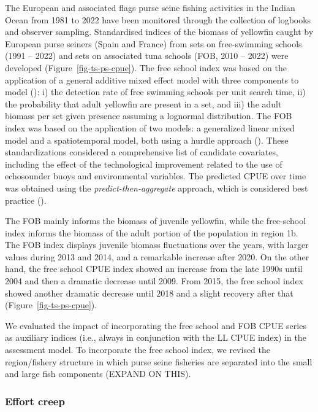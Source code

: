 \documentclass[
]{scrartcl}
\begin{document}
The European and associated flags purse seine fishing activities in the
Indian Ocean from 1981 to 2022 have been monitored through the
collection of logbooks and observer sampling. Standardised indices of
the biomass of yellowfin caught by European purse seiners (Spain and
France) from sets on free-swimming schools (1991 -- 2022) and sets on
associated tuna schools (FOB, 2010 -- 2022) were developed
(Figure~\ref{fig-ts-ps-cpue}). The free school index was based on the
application of a general additive mixed effect model with three
components to model
(): i) the detection rate of free swimming schools per unit search
time, ii) the probability that adult yellowfin are present in a set, and
iii) the adult biomass per set given presence assuming a lognormal
distribution. The FOB index was based on the application of two models:
a generalized linear mixed model and a spatiotemporal model, both using
a hurdle approach (). These standardizations considered a comprehensive list of
candidate covariates, including the effect of the technological
improvement related to the use of echosounder buoys and environmental
variables. The predicted CPUE over time was obtained using the
\emph{predict-then-aggregate} approach, which is considered best
practice ().

The FOB mainly informs the biomass of juvenile yellowfin, while the
free-school index informs the biomass of the adult portion of the
population in region 1b. The FOB index displays juvenile biomass
fluctuations over the years, with larger values during 2013 and 2014,
and a remarkable increase after 2020. On the other hand, the free school
CPUE index showed an increase from the late 1990s until 2004 and then a
dramatic decrease until 2009. From 2015, the free school index showed
another dramatic decrease until 2018 and a slight recovery after that
(Figure~\ref{fig-ts-ps-cpue}).

We evaluated the impact of incorporating the free school and FOB CPUE
series as auxiliary indices (i.e., always in conjunction with the LL
CPUE index) in the assessment model. To incorporate the free school
index, we revised the region/fishery structure in which purse seine
fisheries are separated into the small and large fish components (EXPAND
ON THIS).

\subsubsection{Effort creep}\label{effort-creep}
\end{document}
